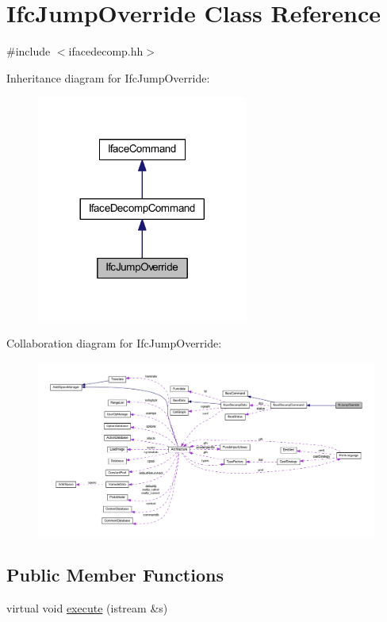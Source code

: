 \hypertarget{class_ifc_jump_override}{}\section{Ifc\+Jump\+Override Class Reference}
\label{class_ifc_jump_override}


{\ttfamily \#include $<$ifacedecomp.\+hh$>$}



Inheritance diagram for Ifc\+Jump\+Override\+:
\nopagebreak
\begin{figure}[H]
\begin{center}
\leavevmode
\includegraphics[width=197pt]{class_ifc_jump_override__inherit__graph}
\end{center}
\end{figure}


Collaboration diagram for Ifc\+Jump\+Override\+:
\nopagebreak
\begin{figure}[H]
\begin{center}
\leavevmode
\includegraphics[width=350pt]{class_ifc_jump_override__coll__graph}
\end{center}
\end{figure}
\subsection*{Public Member Functions}
\begin{DoxyCompactItemize}
\item 
virtual void \mbox{\hyperlink{class_ifc_jump_override_a90f8e712da03bb3c716692501627f890}{execute}} (istream \&s)
\end{DoxyCompactItemize}
